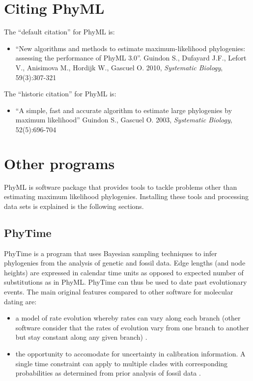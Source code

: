 \documentclass[a4paper,12pt]{article}
\begin{document}
\section{Citing PhyML}
The ``default citation'' for PhyML is:
\begin{itemize}
\item
``New algorithms and methods to estimate maximum-likelihood phylogenies: assessing the performance
of PhyML 3.0''. Guindon S., Dufayard J.F., Lefort V., Anisimova M., Hordijk W., Gascuel O. 2010, {\it Systematic
  Biology}, 59(3):307-321

\end{itemize}
The ``historic citation'' for PhyML is:
\begin{itemize}
\item ``A simple, fast and accurate algorithm to estimate large phylogenies by maximum likelihood''
  Guindon S., Gascuel O. 2003, {\it Systematic Biology}, 52(5):696-704
\end{itemize}



\section{Other programs}

PhyML  is software package  that provides  tools to  tackle problems  other than  estimating maximum
likelihood  phylogenies.  Installing these  tools  and  processing data  sets  is  explained is  the
following sections.

\subsection{PhyTime} PhyTime is  a program that uses Bayesian sampling techniques to
infer phylogenies from the analysis of genetic and fossil data. Edge lengths (and node heights) are
expressed in calendar time units as opposed to expected number of substitutions as in
PhyML. PhyTime can thus be used to date past evolutionary events. The main original features
compared to other software for molecular dating are:
\begin{itemize}
\item a model of rate evolution whereby rates can vary along each branch (other
  software consider that the rates of evolution vary from one branch to another but stay constant
  along any given branch) \cite{guindon13}.
\item the opportunity to accomodate for uncertainty in calibration information. A single time
  constraint can apply to multiple clades with corresponding probabilities as determined from prior
  analysis of fossil data \cite{guindon18}.
\end{itemize}
\end{document}
